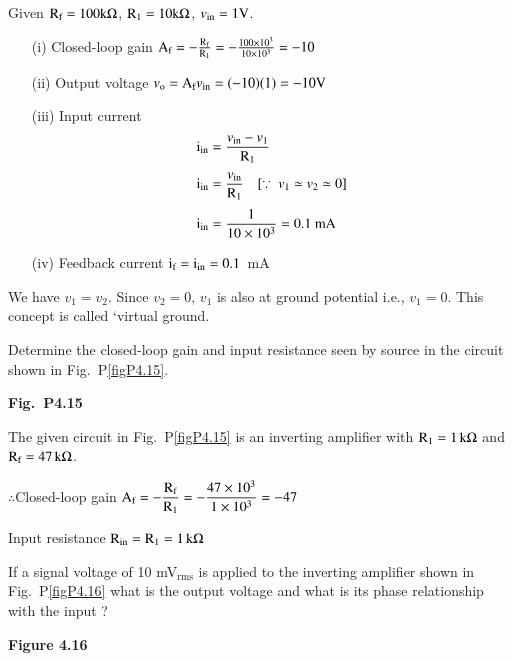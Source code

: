 \begin{solution}
Given $\textrm{R}_{\textrm{f}}=100 \textrm{k}\Omega$, $\textrm{R}_{1}=10 \textrm{k} \Omega$, $v_{\text{in}}=1\textrm{V}$.
\begin{itemize}
\item[(i)] Closed-loop gain $\textrm{A}_{\textrm{f}}=-\frac{\textrm{R}_{\textrm{f}}}{\textrm{R}_{1}}=-\frac{100\times 10^{3}}{10\times 10^{3}}=-10$

\item[(ii)] Output voltage $v_{\textrm{o}}=\textrm{A}_{\textrm{f}}v_{\text{in}}=(-10)(1)=-10\textrm{V}$

\item[(iii)] Input current
\begin{align*}
\rmi_{\text{in}} &= \frac{v_{\text{in}}-v_{1}}{\rmR_{1}}\\[3pt]
\rmi_{\text{in}} &= \frac{v_{\text{in}}}{\rmR_{1}}\quad [\because \ v_{1}\simeq v_{2}\simeq 0]\\[3pt]
\rmi_{\text{in}} &= \frac{1}{10\times 10^{3}}=0.1\text{~mA}
\end{align*}

\item[(iv)] Feedback current $\textrm{i}_{\textrm{f}}=\textrm{i}_{\text{in}}=0.1$~mA
\end{itemize}
We have $v_{1}=v_{2}$. Since $v_{2}=0$, $v_{1}$ is also at ground potential i.e., $v_{1}=0$. This concept is called `virtual ground.
\end{solution}

\begin{problem}\label{prob4.15}
Determine the closed-loop gain and input resistance seen by source in the circuit shown in Fig.~P\ref{figP4.15}.
\begin{center}
{\bf Fig.~P4.15}
\end{center}
\end{problem}

\begin{solution}
The given circuit in Fig.~P\ref{figP4.15} is an inverting amplifier with $\textrm{R}_{1}=1\,\textrm{k}\Omega$ and $\textrm{R}_{\textrm{f}}=47\, \textrm{k}\Omega$.

$\therefore$\quad Closed-loop gain $\textrm{A}_{\textrm{f}}=-\dfrac{\textrm{R}_{\textrm{f}}}{\textrm{R}_{1}}=-\dfrac{47\times 10^{3}}{1\times 10^{3}}=-47$

\medskip
Input resistance $\textrm{R}_{\text{in}}=\textrm{R}_{1}=1\,\textrm{k}\Omega$
\end{solution}

\begin{problem}\label{prob4.16}
If a signal voltage of 10 mV$_{\text{rms}}$ is applied to the inverting amplifier shown in Fig.~P\ref{figP4.16} what is the output voltage and what is its phase relationship with the input ?
\begin{center}
{\bf Figure 4.16}
\end{center}
\end{problem}

